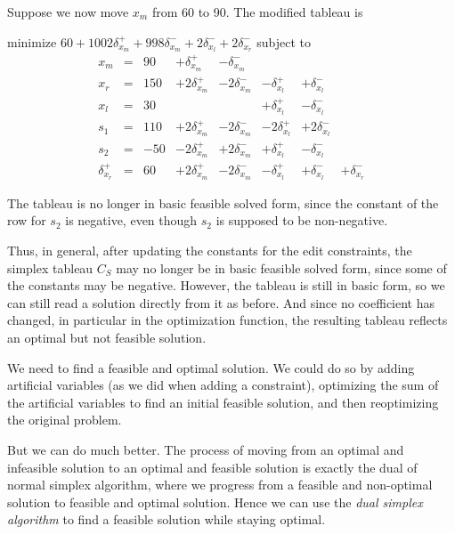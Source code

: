 \documentclass{article}
\begin{document}
Suppose we now move $x_m$ from 60 to 90.  
The modified tableau is 
\begin{trivlist}\item
minimize $60 + 1002 \delta_{x_m}^+ + 998 \delta_{x_m}^-  + 2
\delta_{x_l}^- + 2\delta_{x_r}^- $ 
subject to 
$$
\begin{array}{rlrrrrrr} 
x_m & = &90 &  + \delta_{x_m}^+ & - \delta_{x_m}^- \\
x_r & = &150 & + 2 \delta_{x_m}^+ & - 2\delta_{x_m}^- &
                - \delta_{x_l}^+ & + \delta_{x_l}^- \\ \hline
x_l & = & 30  & & & + \delta_{x_l}^+ & - \delta_{x_l}^- \\
s_1 & = &110 &  + 2 \delta_{x_m}^+ & - 2\delta_{x_m}^- &
                -2 \delta_{x_l}^+ & +2 \delta_{x_l}^- \\
s_2 & = &-50 &   - 2 \delta_{x_m}^+ &+2\delta_{x_m}^- &
                + \delta_{x_l}^+ & - \delta_{x_l}^- \\
\delta_{x_r}^+ & = & 60 & + 2 \delta_{x_m}^+  & - 2\delta_{x_m}^- &
        - \delta_{x_l}^+ & + \delta_{x_l}^- & +\delta_{x_r}^-
\end{array}
$$
\end{trivlist}
The tableau is no longer in basic feasible solved form,
since the constant of the row 
for $s_2$ is negative, even though $s_2$ is supposed to be non-negative.

Thus, in general, after updating the constants for the edit constraints,
the simplex tableau $C_S$ may no longer be in basic feasible solved form,
since some of the constants may be negative.  However, the tableau is still
in basic form, so we can still read a solution directly from it as before.
And since no coefficient has changed, in particular in the optimization
function, the resulting tableau reflects an optimal but not feasible
solution.

We need to find a feasible and optimal solution.  We could do so by adding
artificial variables (as we did when adding a constraint), optimizing the
sum of the artificial variables to find an initial feasible solution, and
then reoptimizing the original problem.

But we can do much better.  The process of moving from an optimal and
infeasible solution to an optimal and feasible solution is exactly the dual
of normal simplex algorithm, where we progress from a feasible and
non-optimal solution to feasible and optimal solution.  Hence we can use
the \emph{dual simplex algorithm} to find a feasible solution while staying
optimal.
\end{document}
